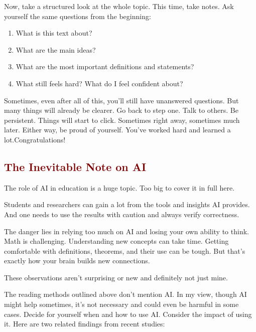 \documentclass[paper=a4, fontsize=12pt]{scrartcl} %
\begin{document}
Now, take a structured look at the whole topic. This time, take notes. Ask yourself the same questions from the beginning:

\begin{enumerate}[label=\alph*]
\item What is this text about?
\item What are the main ideas?
\item What are the most important definitions and statements?
\item What still feels hard? What do I feel confident about?
\end{enumerate}

Sometimes, even after all of this, you’ll still have unanswered questions. But many things will already be clearer. Go back to step one. Talk to others. Be persistent. Things will start to click. Sometimes right away, sometimes much later.
Either way, be proud of yourself. You’ve worked hard and learned a lot.\newline Congratulations!


\subsection*{\textcolor{Maroon}{The Inevitable Note on AI}}

The role of AI in education is a huge topic. Too big to cover it in full here.

\bigskip

Students and researchers can gain a lot from the tools and insights AI provides. And one needs to use the results with caution and always verify correctness.

The danger lies in relying too much on AI and losing your own ability to think. Math is challenging. Understanding new concepts can take time. Getting comfortable with definitions, theorems, and their use can be tough. But that’s exactly how your brain builds new connections.

These observations aren’t surprising or new and definitely not just mine.

\bigskip

The reading methods outlined above don’t mention AI. In my view, though AI might help sometimes, it’s not necessary and could even be harmful in some cases.
Decide for yourself when and how to use AI. Consider the impact of using it. Here are two related findings from recent studies:

\bigskip
\end{document}
